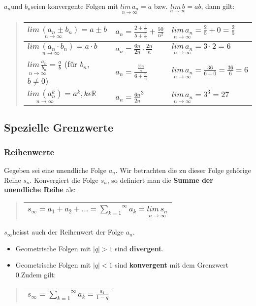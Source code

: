 $a_{n}$und $b_{n}$seien konvergente Folgen mit $\underset{n\rightarrow\infty}{lim\, a_{n}}=a$
bzw. $\underset{n\rightarrow\infty}{lim\, b}=ab$, dann gilt:
\begin{verse}
\begin{tabular}{|l|l|l|}
\hline 
$\underset{n\rightarrow\infty}{lim\,(a_{n}\pm b_{n})}=a\pm b$ & $a_{n}=\frac{2+\frac{3}{n}}{5+\frac{6}{n}}+\frac{50}{n^{2}}$ & $\underset{n\rightarrow\infty}{lim\, a_{n}}=\frac{2}{5}+0=\frac{2}{5}$\tabularnewline
\hline 
$\underset{n\rightarrow\infty}{lim\,(a_{n}\cdot b_{n})}=a\cdot b$ & $a_{n}=\frac{6n}{2n}\cdot\frac{2n}{n}$ & $\underset{n\rightarrow\infty}{lim\, a_{n}}=3\cdot2=6$\tabularnewline
\hline 
$\underset{n\rightarrow\infty}{lim\,\frac{a_{n}}{b_{n}}}=\frac{a}{b}$
(für $b_{n}$, $b\neq0$) & $a_{n}=\frac{\frac{36n}{n}}{6+\frac{6}{n}}$ & $\underset{n\rightarrow\infty}{lim\, a_{n}}=\frac{36}{6+0}=\frac{36}{6}=6$\tabularnewline
\hline 
$\underset{n\rightarrow\infty}{lim\,(a_{n}^{k})}=a^{k},k\epsilon\mathbb{R}$ & $a_{n}=\frac{6n}{2n}^{3}$ & $\underset{n\rightarrow\infty}{lim\, a_{n}}=3^{3}=27$\tabularnewline
\hline 
\end{tabular}
\end{verse}

\subsection*{Spezielle Grenzwerte}


\subsubsection*{Reihenwerte}

Gegeben sei eine unendliche Folge $a_{n}$. Wir betrachten die zu
dieser Folge gehörige Reihe $s_{n}$. Konvergiert die Folge $s_{n}$,
so definiert man die \textbf{Summe der unendliche Reihe} als:
\begin{verse}
\begin{tabular}{|c|}
\hline 
$s_{\infty}=a_{1}+a_{2}+...=\overset{\infty}{\underset{k=1}{\sum}}a_{k}=\underset{n\rightarrow\infty}{lim\, s_{n}}$\tabularnewline
\hline 
\end{tabular}
\end{verse}
$s_{\infty}$heisst auch der Reihenwert der Folge $a_{n}$.
\begin{itemize}
\item Geometrische Folgen mit $\mid q\mid>1$ sind \textbf{divergent}.
\item Geometrische Folgen mit $\mid q\mid<1$ sind \textbf{konvergent} mit
dem Grenzwert 0.Zudem gilt:\end{itemize}
\begin{verse}
\begin{tabular}{|c|}
\hline 
$s_{\infty}=\overset{\infty}{\underset{k=1}{\sum}}a_{k}=\frac{a_{1}}{1-q}$\tabularnewline
\hline 
\end{tabular}\end{verse}

